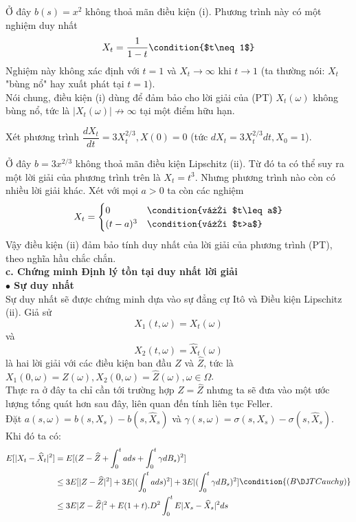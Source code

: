 \documentclass[14pt,a4paper]{article}
\numberwithin{equation}{section}
\begin{document}
Ở đây $b(s)=x^2$ không thoả mãn điều kiện (i). Phương trình này có một nghiệm duy nhất
\begin{equation*}
	X_t=\dfrac{1}{1-t} \condition{$t\neq 1$}
\end{equation*}
Nghiệm này không xác định với $t=1$ và $X_t\rightarrow\infty$ khi $t\rightarrow 1$ (ta thường nói: $X_t$ "bùng nổ" hay xuất phát tại $t=1$).\\
Nói chung, điều kiện (i) dùng để đảm bảo cho lời giải của (PT) $X_t(\omega)$ không bùng nổ, tức là $|X_t(\omega)|\not\to\infty$ tại một điểm hữu hạn.\\
\begin{example}
	Xét phương trình $\dfrac{dX_t}{dt}=3X^{2/3}_t,X(0)=0$ (tức $dX_t=3X^{2/3}_tdt,X_0=1$).
\end{example}
Ở đây $b=3x^{2/3}$ không thoả mãn điều kiện Lipschitz (ii). Từ đó ta có thể suy ra một lời giải của phương trình trên là $X_t=t^3$. Nhưng phương trình nào còn có nhiều lời giải khác. Xét với mọi $a>0$ ta còn các nghiệm
\begin{equation*}
	X_t=\begin{cases}
		0&\condition{với $t\leq a$}\\
		(t-a)^3&\condition{với $t>a$}
	\end{cases}
\end{equation*}
Vậy điều kiện (ii) đảm bảo tính duy nhất của lời giải của phương trình (PT), theo nghĩa hầu chắc chắn.\\
\indent\textbf{c. Chứng minh Định lý tồn tại duy nhất lời giải}\\
\textbf{$\bullet$ Sự duy nhất}\\
Sự duy nhất sẽ được chứng minh dựa vào sự đẳng cự Itô và Điều kiện Lipschitz (ii). Giả sử
\begin{equation*}
	X_1(t,\omega)=X_t(\omega)
\end{equation*}
và
\begin{equation*}
	X_2(t,\omega)=\widehat{X}_t(\omega)
\end{equation*}
là hai lời giải với các điều kiện ban đầu $Z$ và $\widehat{Z}$, tức là $X_1(0,\omega)=Z(\omega),X_2(0,\omega)=\widehat{Z}(\omega),\omega\in\Omega$.\\
Thực ra ở đây ta chỉ cần tới trường hợp $Z=\widehat{Z}$ nhưng ta sẽ đưa vào một ước lượng tổng quát hơn sau đây, liên quan đến tính liên tục Feller.\\
Đặt $a(s,\omega)=b(s,X_s)-b(s,\widehat{X}_s)$ và $\gamma(s,\omega)=\sigma(s,X_s)-\sigma(s,\widehat{X}_s)$. Khi đó ta có:
\begin{equation*}
\begin{split}
	E[|X_t-\widehat{X}_t|^2]&=E[(Z-\widehat{Z}+\int_0^tads+\int_0^t\gamma dB_s)^2]\\
&\leq 3E[|Z-\widehat{Z}|^2]+3E|(\int_0^tads)^2]+3E|(\int_0^t\gamma dB_s)^2]\\
&\leq 3E|Z-\widehat{Z}|^2+E(1+t).D^2\int_0^tE|X_s-\widehat{X}_s|^2ds
\end{split} \condition{(BĐT Cauchy)}
\end{equation*}
\end{document}
